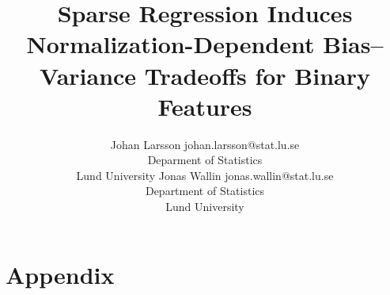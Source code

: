 \documentclass[10pt]{article} %
\title{Sparse Regression Induces Normalization-Dependent Bias--Variance Tradeoffs for Binary Features}
\author{%
  \name Johan Larsson \email johan.larsson@stat.lu.se\\
  \addr Deparment of Statistics\\Lund University
  \AND
  \name Jonas Wallin \email jonas.wallin@stat.lu.se\\
  \addr Department of Statistics\\Lund University
}
\begin{document}
\maketitle

\begin{abstract}
  
\end{abstract}







%

%




\appendix

\section{Appendix}


\end{document}
